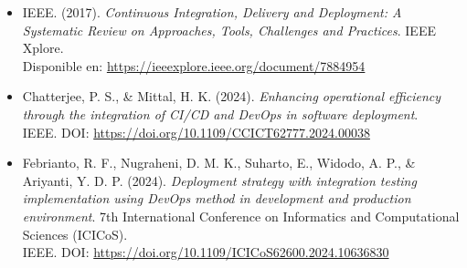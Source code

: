 \documentclass[12pt,a4paper]{article}
\begin{document}
\begin{itemize}
    \item \label{systematic2017} IEEE. (2017). \textit{Continuous Integration, Delivery and Deployment: A Systematic Review on Approaches, Tools, Challenges and Practices}. IEEE Xplore. \\ Disponible en: \url{https://ieeexplore.ieee.org/document/7884954}
    \item \label{chatterjee2024} Chatterjee, P. S., \& Mittal, H. K. (2024). \textit{Enhancing operational efficiency through the integration of CI/CD and DevOps in software deployment}. \\ IEEE. DOI: \url{https://doi.org/10.1109/CCICT62777.2024.00038}
    \item \label{febrianto2024} Febrianto, R. F., Nugraheni, D. M. K., Suharto, E., Widodo, A. P., \& Ariyanti, Y. D. P. (2024). \textit{Deployment strategy with integration testing implementation using DevOps method in development and production environment}. 7th International Conference on Informatics and Computational Sciences (ICICoS). \\ IEEE. DOI: \url{https://doi.org/10.1109/ICICoS62600.2024.10636830}
\end{itemize}
\end{document}
